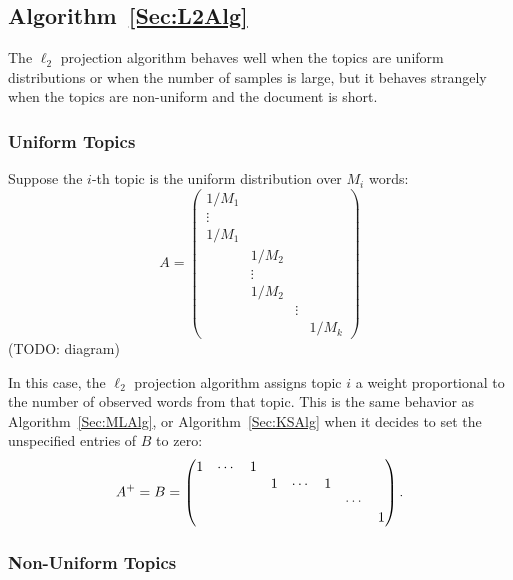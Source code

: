 \documentclass{article}
\begin{document}
\subsection{Algorithm~\ref{Sec:L2Alg}}

The \(\ell_2\) projection algorithm behaves well when the topics are uniform distributions or when the number of samples is large, but it behaves strangely when the topics are non-uniform and the document is short.

\subsubsection{Uniform Topics}

Suppose the \(i\)-th topic is the uniform distribution over \(M_i\) words:
\[
    A =
    \begin{pmatrix}
        1/M_1  &        &        &
    \\  \vdots &        &        &
    \\  1/M_1  &        &        &
    \\         & 1/M_2  &        &
    \\         & \vdots &        &
    \\         & 1/M_2  &        &
    \\         &        & \vdots &
    \\         &        &        & 1/M_k
    \end{pmatrix}
\]
(TODO: diagram)

In this case, the \(\ell_2\) projection algorithm assigns topic \(i\) a weight proportional to the number of observed words from that topic.
This is the same behavior as Algorithm~\ref{Sec:MLAlg}, or Algorithm~\ref{Sec:KSAlg} when it decides to set the unspecified entries of \(B\) to zero:
\[
    A^+ = B =
    \begin{pmatrix}
        1 & \cdots & 1 &   &        &   &        &
    \\    &        &   & 1 & \cdots & 1 &        &
    \\    &        &   &   &        &   & \cdots &
    \\    &        &   &   &        &   &        & 1
    \end{pmatrix}
    \ldotp
\]

\subsubsection{Non-Uniform Topics}
\end{document}

